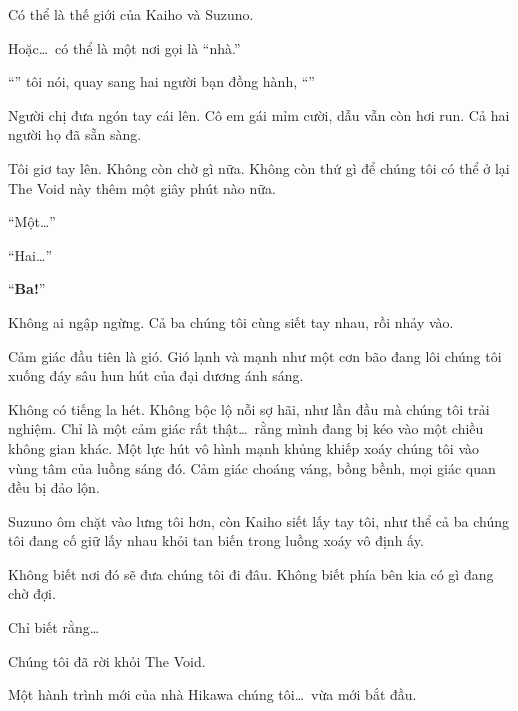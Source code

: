 \documentclass[../main.tex]{subfiles}
\begin{document}
Có thể là thế giới của Kaiho và Suzuno.

Hoặc\dots\ có thể là một nơi gọi là ``nhà.''

``'' tôi nói, quay sang hai người bạn đồng hành, ``''

Người chị đưa ngón tay cái lên. Cô em gái mỉm cười, dẫu vẫn còn hơi run. Cả hai người họ đã sẵn sàng.

Tôi giơ tay lên. Không còn chờ gì nữa. Không còn thứ gì để chúng tôi có thể ở lại The Void này thêm một giây phút nào nữa.

``Một\dots''

``Hai\dots''

``\textbf{Ba!}''

Không ai ngập ngừng. Cả ba chúng tôi cùng siết tay nhau, rồi nhảy vào.

Cảm giác đầu tiên là gió. Gió lạnh và mạnh như một cơn bão đang lôi chúng tôi xuống đáy sâu hun hút của đại dương ánh sáng.

Không có tiếng la hét. Không bộc lộ nỗi sợ hãi, như lần đầu mà chúng tôi trải nghiệm. Chỉ là một cảm giác rất thật\dots\ rằng mình đang bị kéo vào một chiều không gian khác. Một lực hút vô hình mạnh khủng khiếp xoáy chúng tôi vào vùng tâm của luồng sáng đó. Cảm giác choáng váng, bồng bềnh, mọi giác quan đều bị đảo lộn.

Suzuno ôm chặt vào lưng tôi hơn, còn Kaiho siết lấy tay tôi, như thể cả ba chúng tôi đang cố giữ lấy nhau khỏi tan biến trong luồng xoáy vô định ấy.

Không biết nơi đó sẽ đưa chúng tôi đi đâu. Không biết phía bên kia có gì đang chờ đợi.

Chỉ biết rằng\dots

Chúng tôi đã rời khỏi The Void.

Một hành trình mới của nhà Hikawa chúng tôi\dots\ vừa mới bắt đầu.
\end{document}
